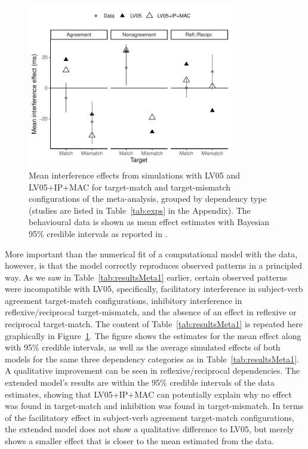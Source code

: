 \documentclass{cambridge7A}\usepackage[]{graphicx}\usepackage[]{color}
\begin{document}
\begin{figure}[!htbp]
\centering
\includegraphics[width=0.8\textwidth]{figures/fig-simresultsBayesMeans} 
\caption{Mean interference effects from simulations with LV05 and LV05+IP+MAC for target-match and target-mismatch configurations of the meta-analysis, grouped by dependency type (studies are listed in Table~\ref{tab:exps} in the Appendix). The behavioural data is shown as mean effect estimates with Bayesian 95\% credible intervals as reported in \cite{JaegerEngelmannVasishth2017}.}\label{fig:simresultsBayesMeans} 
\end{figure}
%


More important than the numerical fit of a computational model with the data, however, is that the model correctly reproduces observed patterns in a principled way. As we saw in Table~\ref{tab:resultsMeta1} earlier, certain observed patterns were incompatible with LV05, specifically, facilitatory interference in subject-verb agreement target-match configurations, inhibitory interference in reflexive/reciprocal target-mismatch, and the absence of an effect in reflexive or reciprocal target-match.
The content of Table~\ref{tab:resultsMeta1} is repeated here graphically in Figure~\ref{fig:simresultsBayesMeans}. The figure shows the estimates for the mean effect  along with 95\% credible intervals, as well as the average simulated effects of both models for the same three dependency categories as in Table~\ref{tab:resultsMeta1}.
A qualitative improvement can be seen in reflexive/reciprocal dependencies. The extended model's results are within the 95\% credible intervals of the data estimates, showing that LV05+IP+MAC can potentially explain why no effect was found in target-match and inhibition was found in target-mismatch.
In terms of the facilitatory effect in subject-verb agreement target-match configurations, the extended model does not show a qualitative difference to LV05, but merely shows a smaller effect that is closer to the mean estimated from the data.
\end{document}
